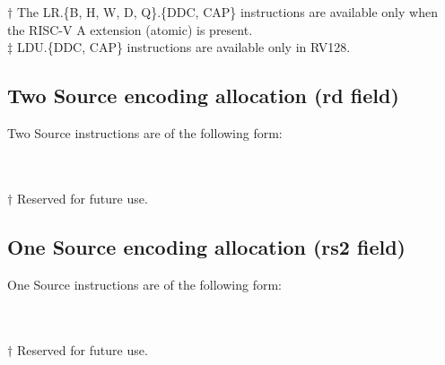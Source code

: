 {	\rvcheriheader

	\vspace{1em}

	{\scriptsize
	\def\rvcheriatomicfootnotemark{$\dagger$}
	\def\rvcherildufootnotemark{$\ddagger$}
	\rvcherienctableexpload\\\\
	$\dagger$ The LR.\{B, H, W, D, Q\}.\{DDC, CAP\} instructions are available only when the RISC-V A extension (atomic) is present.\\
	$\ddagger$ LDU.\{DDC, CAP\} instructions are available only in RV128.
	}

	\vspace{1em}

	\subsection*{Two Source encoding allocation  (rd field)}
	Two Source instructions are of the following form:
	\vspace{1em}

	\rvcheriheader

	\vspace{1em}

	{\scriptsize
	\def\rvcherireservedfootnotemark{$\dagger$}
	\rvcherienctablesrcsrc\\\\
	$\dagger$ Reserved for future use.
	}

	\vspace{1em}

	\subsection*{One Source encoding allocation (rs2 field)}
	One Source instructions are of the following form:

	\vspace{1em}

	\rvcheriheader

	\vspace{1em}

	{\scriptsize
	\def\rvcherireservedfootnotemark{$\dagger$}
	\rvcherienctablesrc\\\\
	$\dagger$ Reserved for future use.
	}

	\vspace{1em}

}

